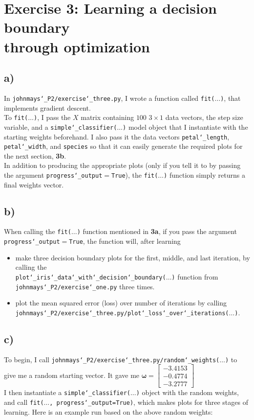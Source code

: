 \documentclass{article} %
\newcommand{\us}{\char`_}
\begin{document}
\section*{Exercise 3: Learning a decision boundary \\through optimization}
\subsection*{a)}
In \texttt{johnmays\us P2/exercise\us three.py}, I wrote a function called \texttt{fit($\hdots$)}, that implements gradient descent.\\
\linebreak
To \texttt{fit($\hdots$)}, I pass the $X$ matrix containing $100$ $3 \times 1$ data vectors, the step size variable, and a \texttt{simple\us classifier($\hdots$)} model object that I instantiate with the starting weights beforehand.  I also pass it the data vectors \texttt{petal\us length}, \texttt{petal\us width}, and \texttt{species} so that it can easily generate the required plots for the next section, \textbf{3b}.\\
\linebreak
In addition to producing the appropriate plots (only if you tell it to by passing the argument \texttt{progress\us output}$=$\texttt{True}), the \texttt{fit($\hdots$)} function simply returns a final weights vector.
\subsection*{b)}
When calling the \texttt{fit($\hdots$)} function mentioned in \textbf{3a}, if you pass the argument \texttt{progress\us output}$=$\texttt{True}, the function will, after learning
\begin{itemize}
    \item make three decision boundary plots for the first, middle, and last iteration, by calling the\\ \texttt{plot\us iris\us data\us with\us decision\us boundary($\hdots$)} function from \texttt{johnmays\us P2/exercise\us one.py} three times.
    \item plot the mean squared error (loss) over number of iterations by calling\\ \texttt{johnmays\us P2/exercise\us three.py/plot\us loss\us over\us iterations($\hdots$)}.
\end{itemize}
\subsection*{c)}
To begin, I call \texttt{johnmays\us P2/exercise\us three.py/random\us weights($\hdots$)} to give me a random starting vector.  It gave me $\boldsymbol{\omega}=\begin{bmatrix}-3.4153\\-0.4774\\-3.2777\end{bmatrix}$\\
I then instantiate a \texttt{simple\us classifier($\hdots$)} object with the random weights, and call \texttt{fit($\hdots$, progress\us output=True)}, which makes plots for three stages of learning.  Here is an example run based on the above random weights:
\end{document}
